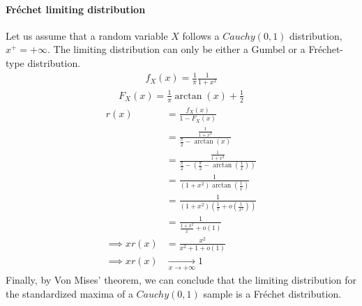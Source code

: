 \paragraph{Fr\'{e}chet limiting distribution}
Let us assume that a random variable $X$ follows a $Cauchy(0,1)$ distribution, $x^+ = + \infty$. The limiting distribution can only be either a Gumbel or a Fréchet-type distribution.
\begin{equation}
\begin{alignat*}{2}
f_X(x) = \frac{1}{\pi} \frac{1}{1 + x^2}
\end{alignat*}
\end{equation}
\begin{equation}
\begin{alignat*}{2}
F_X(x) = \frac{1}{\pi} \arctan(x) + \frac{1}{2}
\end{alignat*}
\end{equation}
\begin{equation}
\begin{alignat*}{2}
r(x) &= \frac{f_X(x)}{1 - F_X(x)} \\
&= \frac{\frac{1}{1 + x^2}}{\frac{\pi}{2} - \arctan(x)} \\
&= \frac{\frac{1}{1 + x^2}}{\frac{\pi}{2} - (\frac{\pi}{2} - \arctan(\frac{1}{x}))}\\
&= \frac{1}{(1 + x^2) \arctan(\frac{1}{x})}\\
&= \frac{1}{(1 + x^2) (\frac{1}{x} + o(\frac{1}{x^2}))}\\
&= \frac{1}{\frac{1 + x^2}{x} + o(1)}\\
\implies x r(x) &= \frac{x^2}{x^2 + 1 + o(1)} \\
\implies x r(x) &\xrightarrow[x \rightarrow + \infty]{} 1
\end{alignat*}
\end{equation}
Finally, by Von Mises' theorem, we can conclude that the limiting distribution for the standardized maxima of a $Cauchy(0,1)$ sample is a Fréchet distribution.

